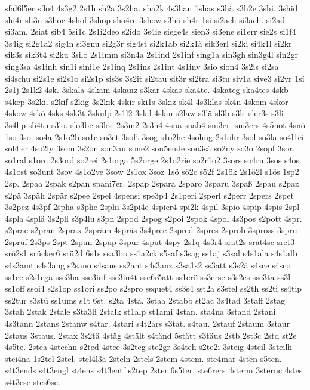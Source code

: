 {sfal6l5er
sflo4
4s3g2
2s1h
sh2a
3s2ha.
sha2k
4s3han
1shas
s3hä
s3h2e
3shi.
3shid
shi4r
sh3n
s3hoc
4shof
3shop
sho4re
3show
s3hö
sh4r
1si
si2ach
si3ach.
si2ad
si3am.
2siat
sib4
5si1c
2s1i2deo
s2ido
3s4ie
siege4s
sien3
si3ene
si1err
sie2s
si1f4
3s4ig
si2g1a2
sig4n
si3gnu
si2g3r
sig4st
si2k1ab
si2k1ä
sik3erl
si2ki
si4k1l
si2kr
sik3s
sik3t4
si2ku
3silo
2s1imm
si3n4a
2s1ind
2s1inf
sing1a
sin3gh
sin3g4l
sin2gr
sing3sa
4s1inh
sin1i
sini1e
2s1inq
2s1ins
2s1int
4s1inv
3sio
sion4
3s2is
si2sa
si4schu
si2s1e
si2s1o
si2s1p
sis3s
3s2it
si2tau
sit3r
si2tra
si3tu
siv1a
sive3
si2vr
1sí
2s1j
2s1k2
4sk.
3skala
4skam
4skanz
s3kar
4skas
ska4te.
4skateg
ska4tes
4skb
s4kep
3s2ki.
s2kif
s2kig
3s2kik
4skir
ski1s
3skiz
sk4l
4s3klas
sk4n
4skom
4skor
4skow
4skö
4sks
4sk3t
3skulp
2s1l2
3slal
4slan
s2law
s3lä
sl3b
s3le
sler3s
s3li
3s4lip
sli4tu
s3lo.
slo3be
s3loe
2s3m2
2s3n4
4sna
snab4
sni3er.
sni3ers
4s5not
4snö
1so
3so.
so4a
2s1o2b
so1c
so3et
3soft
3sog
s1o2he
4sohng
2s1ohr
3sol
so3la
so4l1ei
sol4ler
4so2ly
3som
3s2on
son3au
sone2
son5ende
son3sä
so2ny
so3o
2sopf
3sor.
so1ral
s1orc
2s3ord
so2rei
2s1orga
5s2orge
2s1o2rie
so2r1o2
3sors
so4ru
3sos
s4os.
4s1ost
so3unt
3sov
4s1o2ve
3sow
2s1ox
3soz
1sö
sö2c
sö2f
2s1ök
2s1ö2l
s1ös
1sp2
2sp.
2spaa
2spak
s2pan
spani7er.
2spap
2spara
2sparo
3sparu
3spaß
2spau
s2paz
s2pä
3späh
2spär
s2pee
2spel
4spensi
spe3p4
2s1peri
2sperl
s2perr
2spers
2spet
3s2pez
4s3pf
2spha
s3phe
2sphi
3s2pi4e
4spier4
spi2k
4spil
3spio
4spip
4spis
2spl
4spla
4splä
3s2pli
s3p4lu
s3pn
2spod
2spog
s2poi
2spok
4spol
4s3pos
s2pott
4spr.
s2prac
s2pran
2sprax
2spräm
4spräs
3s4prec
2spred
2spres
2sprob
3spross
3spru
2sprüf
2s3ps
2spt
2spun
2spup
3spur
4sput
4spy
2s1q
4s3r4
srat2s
srat4sc
sret3
srö2s1
srücker6
srü2d
6s1s
ssa3bo
ss1a2ck
s5saf
s3sag
ss1aj
s3sal
s4s1ala
s4s1alb
s4s3amt
s4s3ang
s2sano
s4sans
ss2ant
s4s3anz
s3sa1s2
ss3att
s3s2ä
s4sce
s4sco
ss1ec
s2s1ega
sse3ha
sse3inf
sse3in4t
sse6r5att
ss1erö
ss3erse
s3s2es
sse3ta
ss3l
ss1off
ssoi4
s2s1op
ss1ori
ss2po
s2spro
ssquet4
ss3s4
sst2a
s3stel
ss2th
ss2ti
ss4tip
ss2tur
s3stü
ss1ums
s1t
6st.
s2ta
4sta.
3staa
2stabb
st2ac
3s4tad
3staff
2stag
3stah
2stak
2stale
s3ta3li
2stalk
st1alp
st1ami
4stan.
sta4na
3stand
2stani
4s3tann
2stans
2stanw
s4tar.
4stari
s4t2ars
s3tat.
s4tau.
2stauf
2staum
3staur
2staus
3staus.
2stax
3s2tä
4stäg
4stält
s4tänd
5stätt
s3täus
2stb
2st3c
2std
st2e
4s5te.
2stea
4stechn
s2ted
4stee
3s2teg
ste2gr
3s4teh
s2te2i
3steig
4steil
3steilh
stei4na
1s2tel
2stel.
stel4l3ä
2steln
2stels
2stem
4stem.
ste4mar
4sten
s5ten.
s4t3ends
s4t3engl
st4ens
s4t3entf
s2tep
2ster
6s5ter.
ste6rers
4sterm
3sternc
4stes
s4t3ese
stes6se.
}
